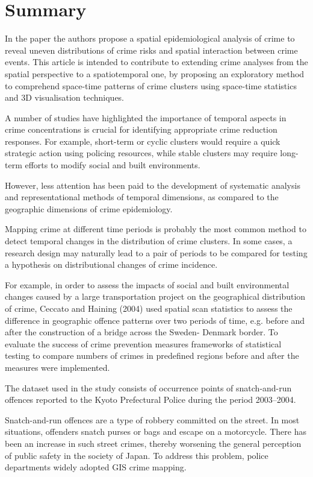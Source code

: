 \documentclass[11pt,letterpaper,english]{article}
\begin{document}
\section*{Summary}

In the paper \cite{visCrime} the authors propose a spatial epidemiological analysis of crime to reveal uneven distributions of crime risks and spatial interaction between crime events. This article is intended to contribute to extending crime analyses from the spatial perspective to a spatiotemporal one, by proposing an exploratory method to comprehend space-time patterns of crime clusters using space-time statistics and 3D visualisation techniques.

A number of studies have highlighted the importance of temporal aspects in crime concentrations is crucial for identifying appropriate crime reduction responses. For example, short-term or cyclic clusters would require a quick strategic action using policing resources, while stable clusters may require long-term efforts to modify social and built environments. 

However, less attention has been paid to the development of systematic analysis and representational methods of temporal dimensions, as compared to the geographic dimensions of crime epidemiology.

Mapping crime at different time periods is probably the most common method to detect temporal changes in the distribution of crime clusters. In some cases, a research design may naturally lead to a pair of periods to be compared for testing a hypothesis on distributional changes of crime incidence. 

For example, in order to assess the impacts of social and built environmental changes caused by a large transportation project on the geographical distribution of crime, Ceccato and Haining (2004) used spatial scan statistics to assess the difference in geographic offence patterns over two periods of time, e.g. before and after the construction of a bridge across the Sweden- Denmark border. To evaluate the success of crime prevention measures frameworks of statistical testing to compare numbers of crimes in predefined regions before and after the measures were implemented. 

The dataset used in the study consists of occurrence points of snatch-and-run offences reported to the Kyoto Prefectural Police during the period 2003–2004.

Snatch-and-run offences are a type of robbery committed on the street. In most situations, offenders snatch purses or bags and escape on a motorcycle. There has been an increase in such street crimes, thereby worsening the general perception of public safety in the society of Japan. To address this problem, police departments widely adopted GIS crime mapping. 
\end{document}
